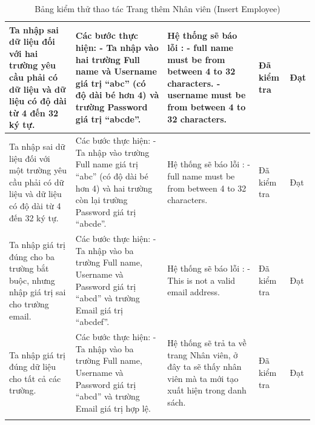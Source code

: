 \documentclass[a4paper]{article}
\begin{document}
\begin{longtable}{ | p{} |p{} | p{}  | p{}  | p{}  | }
\hline
Ta nhập sai dữ liệu đối với hai trường yêu cầu phải có dữ liệu và dữ liệu có độ dài từ 4 đến 32 ký tự.
&
Các bước thực hiện: \newline
- Ta nhập vào hai trường Full name và Username giá trị “abc” (có độ dài bé hơn 4) và trường Password giá trị “abcde”. 
&
Hệ thống sẽ báo lỗi : \newline
- full name must be from between 4 to 32 characters. \newline
- username must be from between 4 to 32 characters.
&
Đã kiểm tra &
Đạt \\

\hline
Ta nhập sai dữ liệu đối với một trường yêu cầu phải có dữ liệu và dữ liệu có độ dài từ 4 đến 32 ký tự.
&
Các bước thực hiện: \newline
- Ta nhập vào trường Full name giá trị “abc” (có độ dài bé hơn 4) và hai trường còn lại trường Password giá trị “abcde”.  
&
Hệ thống sẽ báo lỗi : \newline
- full name must be from between 4 to 32 characters.
&
Đã kiểm tra &
Đạt \\

\hline
Ta nhập giá trị đúng cho ba trường bắt buộc, nhưng nhập giá trị sai cho trường email.
&
Các bước thực hiện: \newline
- Ta nhập vào ba trường Full name, Username và Password giá trị “abcd” và trường Email giá trị “abcdef”.  
&
Hệ thống sẽ báo lỗi : \newline
- This is not a valid email address.
&
Đã kiểm tra &
Đạt \\

\hline
Ta nhập giá trị đúng dữ liệu cho tất cả các trường.
&
Các bước thực hiện: \newline
- Ta nhập vào ba trường Full name, Username và Password giá trị “abcd” và trường Email giá trị hợp lệ.  
&
Hệ thống sẽ trả ta về trang Nhân viên, ở đây ta sẽ thấy nhân viên mà ta mới tạo xuất hiện trong danh sách.
&
Đã kiểm tra &
Đạt \\

\hline
\caption{Bảng kiểm thử thao tác Trang thêm Nhân viên (Insert Employee)}
\end{longtable}

\end{document}
